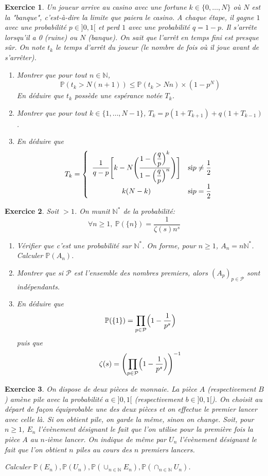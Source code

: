 \documentclass[12pt]{article}
\newtheorem{exercise}{Exercice}[section]
\theoremstyle{remark}
\theoremstyle{remark}
\newcommand{\N}{\mathbb{N}} \newcommand{\Z}{\mathbb{Z}}
\renewcommand{\P}{\mathbb{P}} \newcommand{\im}{\emph{Im}}
\begin{document}
\begin{exercise}
	Un joueur arrive au casino avec une fortune $k\in\{0,\dots,N\}$ où $N$ est la
	"banque", c'est-à-dire la limite que paiera le casino. A chaque étape, il
	gagne $1$ avec une probabilité $p\in]0,1[$ et perd $1$ avec une probabilité
	$q=1-p$. Il s'arrête lorsqu'il a 0 (ruine) ou $N$ (banque). On sait que
	l'arrêt en temps fini est presque sûr. On note $t_{k}$ le temps d'arrêt du
	joueur (le nombre de fois où il joue avant de s'arrêter).
	\begin{enumerate}
		\item
		Montrer que pour tout $n\in\N$,
		$$\P(t_{k}>N(n+1))\leqslant\P(t_{k}>Nn)\times(1-p^{N})$$ En déduire que
		$t_{k}$ possède une espérance notée $T_{k}$.
		\item
		Montrer que pour tout $k\in\{1,\dots,N-1\}$,
		$T_{k}=p(1+T_{k+1})+q(1+T_{k-1})$.
		\item
		En déduire que 
		$$T_{k}= \left\{
			\begin{array}[]{cc}
				\dfrac{1}{q-p}\Biggl[k-N\Biggl(\dfrac{1-\Bigl(\dfrac{q}{p}\Bigr)^{k}}{1-\Bigl(\dfrac{q}{p}\Bigr)^{n}}\Biggr)\Biggr]
& \text{si}p\neq\dfrac{1}{2}\\
				k(N-k) & \text{si}p=\dfrac{1}{2}
			\end{array}
		\right.$$
	\end{enumerate}
\end{exercise}

\begin{exercise}
	Soit $>1$. On munit $\N^{*}$ de la probabilité:
	$$\forall n\geqslant1,~\P(\{n\})=\frac{1}{\zeta(s)n^{s}}$$
	\begin{enumerate}
		\item
		Vérifier que c'est une probabilité sur $\N^{*}$. On forme, pour
		$n\geqslant 1$, $A_{n}=n\N^{*}$. Calculer $\P(A_{n})$.
		\item
		Montrer que si $\mathcal{P}$ est l'ensemble des nombres premiers, alors
		$(A_{p})_{p\in\mathcal{P}}$ sont indépendants.
		\item
		En déduire que 
		$$\P(\{1\})=\prod_{p\in\mathcal{P}}\Bigl(1-\frac{1}{p^{s}}\Bigr)$$ puis
		que 
		$$\zeta(s)=\Biggl(\prod_{p\in\mathcal{P}}\Bigl(1-\frac{1}{p^{s}}\Bigr)\Biggr)^{-1}$$
	\end{enumerate}
\end{exercise}

\begin{exercise}
	On dispose de deux pièces de monnaie. La pièce $A$ (respectivement $B$) amène
	pile avec la probabilité $a\in]0,1[$ (respectivement $b\in]0,1[$). On choisit
	au départ de façon équiprobable une des deux pièces et on effectue le premier
	lancer avec celle là. Si on obtient pile, on garde la même, sinon on change.
	Soit, pour $n\geqslant1$, $E_{n}$ l'évènement désignant le fait que l'on
	utilise pour la première fois la pièce $A$ au $n$-ième lancer. On indique de
	même par $U_{n}$ l'évènement désignant le fait que l'on obtient $n$ piles au
	cours des $n$ premiers lancers.

	Calculer $\P(E_{n}),\P(U_{n}),\P(\cup_{n\in\N}E_{n}),\P(\cap_{n\in\N}U_{n})$.
\end{exercise}
\end{document}
